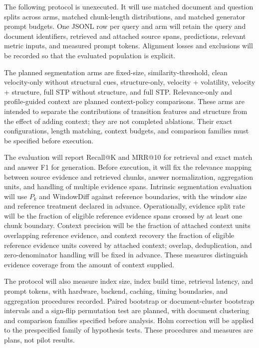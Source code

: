 \documentclass[10pt]{article}
\begin{document}
The following protocol is unexecuted. It will use matched document and question splits across arms, matched chunk-length distributions, and matched generator prompt budgets. One JSONL row per query and arm will retain the query and document identifiers, retrieved and attached source spans, predictions, relevant metric inputs, and measured prompt tokens. Alignment losses and exclusions will be recorded so that the evaluated population is explicit.

The planned segmentation arms are fixed-size, similarity-threshold, clean velocity-only without structural cues, structure-only, velocity + volatility, velocity + structure, full STP without structure, and full STP. Relevance-only and profile-guided context are planned context-policy comparisons. These arms are intended to separate the contributions of transition features and structure from the effect of adding context; they are not completed ablations. Their exact configurations, length matching, context budgets, and comparison families must be specified before execution.

The evaluation will report Recall@K and MRR@10 for retrieval and exact match and answer F1 for generation. Before execution, it will fix the relevance mapping between source evidence and retrieved chunks, answer normalization, aggregation units, and handling of multiple evidence spans. Intrinsic segmentation evaluation will use $P_k$ and WindowDiff against reference boundaries, with the window size and reference treatment declared in advance. Operationally, evidence split rate will be the fraction of eligible reference evidence spans crossed by at least one chunk boundary. Context precision will be the fraction of attached context units overlapping reference evidence, and context recovery the fraction of eligible reference evidence units covered by attached context; overlap, deduplication, and zero-denominator handling will be fixed in advance. These measures distinguish evidence coverage from the amount of context supplied.

The protocol will also measure index size, index build time, retrieval latency, and prompt tokens, with hardware, backend, caching, timing boundaries, and aggregation procedures recorded. Paired bootstrap or document-cluster bootstrap intervals and a sign-flip permutation test are planned, with document clustering and comparison families specified before analysis. Holm correction will be applied to the prespecified family of hypothesis tests. These procedures and measures are plans, not pilot results.
\end{document}
